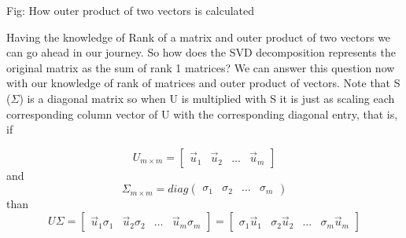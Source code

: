 \documentclass{article}
\begin{document}
\begin{center}
\end{center}

\vspace{0.5cm}

\begin{center}
    Fig: How outer product of two vectors is calculated
\end{center}

\vspace{0.5cm}

Having the knowledge of Rank of a matrix and outer product of two vectors we can go ahead in our journey. So how does the SVD decomposition represents the original matrix as the sum of rank 1 matrices? We can answer this question now with our knowledge of rank of matrices and outer product of vectors. Note that S ($\Sigma$) is a diagonal matrix so when U is multiplied with S it is just as scaling each corresponding column vector of U with the corresponding diagonal entry, that is, if 

$$
U_{m \times m} = \begin{bmatrix}
    \vec{u}_{1} & \vec{u}_{2} & \dots &\vec{u}_{m}
\end{bmatrix}
$$ and
$$
\Sigma_{m \times m} = diag(\begin{matrix}
    \sigma_{1} & \sigma_{2} & \dots & \sigma_{m}
\end{matrix})
$$ than
$$
U\Sigma = \begin{bmatrix}
    \vec{u}_{1}\sigma_{1} & \vec{u}_{2}\sigma_{2} & \dots & \vec{u}_{m}\sigma_{m}
\end{bmatrix}
= \begin{bmatrix}
    \sigma_{1} \vec{u}_{1} & \sigma_{2} \vec{u}_{2} & \dots & \sigma_{m} \vec{u}_{m}
\end{bmatrix}
$$
\end{document}
